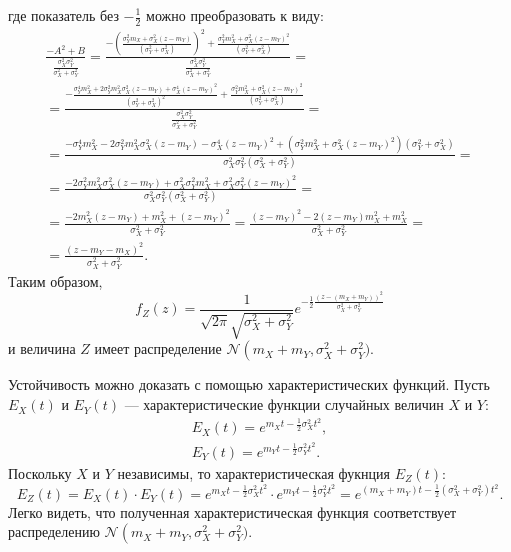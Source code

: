 где показатель без $-\frac{1}{2}$ можно преобразовать к виду:
\begin{multline}
    \frac{- A^2 + B}{\frac{\sigma_X^2 \sigma_Y^2}{\sigma_X^2 + \sigma_Y^2}}
    = \frac{- \left ( \frac{\sigma_Y^2 m_X + \sigma_X^2 (z - m_Y)}{(\sigma_Y^2 + \sigma_X^2)} \right )^2 + \frac{\sigma_Y^2 m_X^2 + \sigma_X^2 (z - m_Y)^2}{(\sigma_Y^2 + \sigma_X^2)}}{\frac{\sigma_X^2 \sigma_Y^2}{\sigma_X^2 + \sigma_Y^2}} = \\
    = \frac{- \frac{\sigma_Y^4 m_X^2 + 2 \sigma_Y^2 m_X^2 \sigma_X^2 (z - m_Y) + \sigma_X^4 (z - m_Y)^2}{(\sigma_Y^2 + \sigma_X^2)^2} + \frac{\sigma_Y^2 m_X^2 + \sigma_X^2 (z - m_Y)^2}{(\sigma_Y^2 + \sigma_X^2)}}{\frac{\sigma_X^2 \sigma_Y^2}{\sigma_X^2 + \sigma_Y^2}} = \\
    = \frac{- \sigma_Y^4 m_X^2 - 2 \sigma_Y^2 m_X^2 \sigma_X^2 (z - m_Y) - \sigma_X^4 (z - m_Y)^2 + \left ( \sigma_Y^2 m_X^2 + \sigma_X^2 (z - m_Y)^2 \right ) (\sigma_Y^2 + \sigma_X^2)}{\sigma_X^2 \sigma_Y^2 \left ( \sigma_X^2 + \sigma_Y^2 \right )} = \\
    = \frac{- 2 \sigma_Y^2 m_X^2 \sigma_X^2 (z - m_Y) + \sigma_X^2 \sigma_Y^2 m_X^2 + \sigma_X^2 \sigma_Y^2 (z - m_Y)^2}{\sigma_X^2 \sigma_Y^2 \left ( \sigma_X^2 + \sigma_Y^2 \right )} = \\
    = \frac{- 2 m_X^2 (z - m_Y) + m_X^2 + (z - m_Y)^2}{\sigma_X^2 + \sigma_Y^2}
    = \frac{(z - m_Y)^2 - 2 (z - m_Y) m_X^2 + m_X^2}{\sigma_X^2 + \sigma_Y^2} = \\
    = \frac{(z - m_Y - m_X)^2}{\sigma_X^2 + \sigma_Y^2} .
\end{multline}
Таким образом,
\begin{equation}
    f_Z(z)
    = \frac{1}{\sqrt{2 \pi} \sqrt{\sigma_X^2 + \sigma_Y^2}} e^{ -\frac{1}{2} \frac{(z - (m_X + m_Y))^2}{\sigma_X^2 + \sigma_Y^2}}
\end{equation}
и величина $Z$ имеет распределение $\mathcal{N} \left ( m_X + m_Y, \sigma_X^2 + \sigma_Y^2)$.

Устойчивость можно доказать с помощью характеристических функций. Пусть $E_X(t)$ и $E_Y(t)$ --- характеристические функции случайных величин $X$ и $Y$:
\begin{gather}
    E_X(t) =  e^{m_X t - \frac{1}{2} \sigma_X^2 t^2} , \\
    E_Y(t) =  e^{m_Y t - \frac{1}{2} \sigma_Y^2 t^2} .
\end{gather}
Поскольку $X$ и $Y$ независимы, то характеристическая фукнция $E_Z(t)$:
\begin{equation}
    E_Z(t)
    = E_X(t) \cdot E_Y(t)
    = e^{m_X t - \frac{1}{2} \sigma_X^2 t^2} \cdot e^{m_Y t - \frac{1}{2} \sigma_Y^2 t^2}
    = e^{\left ( m_X + m_Y \right ) t - \frac{1}{2} \left ( \sigma_X^2 + \sigma_Y^2 \right ) t^2} .
\end{equation}
Легко видеть, что полученная характеристическая функция соответствует распределению $\mathcal{N} \left ( m_X + m_Y, \sigma_X^2 + \sigma_Y^2)$.

